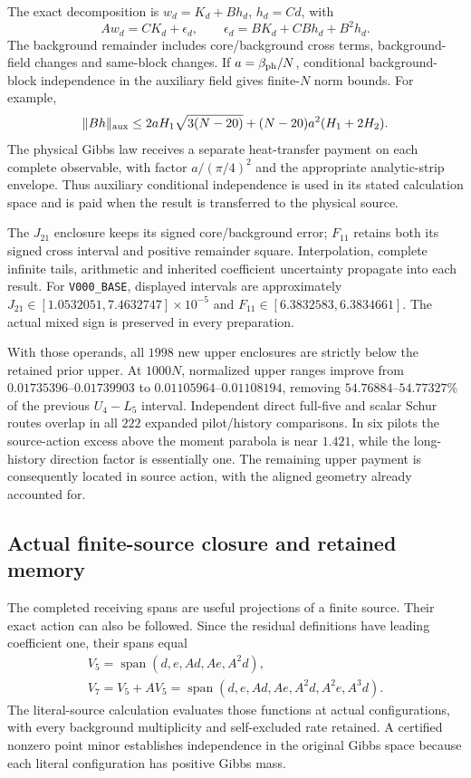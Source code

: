 The exact decomposition is $w_d=K_d+Bh_d$, $h_d=Cd$, with
\[
 Aw_d=CK_d+\epsilon_d,
 \qquad\epsilon_d=BK_d+CBh_d+B^2h_d.
\]
The background remainder includes core/background cross terms, background-field changes and same-block changes. If $a=\beta_{\rm ph}/N$, conditional background-block independence in the auxiliary field gives finite-$N$ norm bounds. For example,
\[
 \|Bh\|_{\rm aux}\leq
 2aH_1\sqrt{3(N-20)}+(N-20)a^2(H_1+2H_2).
\]
The physical Gibbs law receives a separate heat-transfer payment on each complete observable, with factor $a/(\pi/4)^2$ and the appropriate analytic-strip envelope. Thus auxiliary conditional independence is used in its stated calculation space and is paid when the result is transferred to the physical source.

The $J_{21}$ enclosure keeps its signed core/background error; $F_{11}$ retains both its signed cross interval and positive remainder square. Interpolation, complete infinite tails, arithmetic and inherited coefficient uncertainty propagate into each result. For \texttt{V000\_BASE}, displayed intervals are approximately $J_{21}\in[1.0532051,7.4632747]\times10^{-5}$ and $F_{11}\in[6.3832583,6.3834661]$. The actual mixed sign is preserved in every preparation.

With those operands, all $1998$ new upper enclosures are strictly below the retained prior upper. At $1000N$, normalized upper ranges improve from $0.01735396$--$0.01739903$ to $0.01105964$--$0.01108194$, removing $54.76884$--$54.77327\%$ of the previous $U_4-L_5$ interval. Independent direct full-five and scalar Schur routes overlap in all $222$ expanded pilot/history comparisons. In six pilots the source-action excess above the moment parabola is near $1.421$, while the long-history direction factor is essentially one. The remaining upper payment is consequently located in source action, with the aligned geometry already accounted for.

\subsection{Actual finite-source closure and retained memory}

The completed receiving spans are useful projections of a finite source. Their exact action can also be followed. Since the residual definitions have leading coefficient one, their spans equal
\[
\begin{gathered}
V_5=\operatorname{span}(d,e,Ad,Ae,A^2d),\\
V_7=V_5+AV_5
 =\operatorname{span}(d,e,Ad,Ae,A^2d,A^2e,A^3d).
\end{gathered}
\]
The literal-source calculation evaluates those functions at actual configurations, with every background multiplicity and self-excluded rate retained. A certified nonzero point minor establishes independence in the original Gibbs space because each literal configuration has positive Gibbs mass. 

